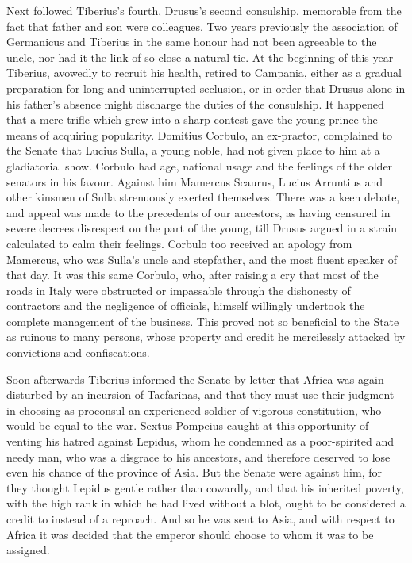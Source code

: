 Next followed Tiberius's fourth, Drusus's second consulship, memorable from the fact that father and son were colleagues. Two years previously the association of Germanicus and Tiberius in the same honour had not been agreeable to the uncle, nor had it the link of so close a natural tie. At the beginning of this year Tiberius, avowedly to recruit his health, retired to Campania, either as a gradual preparation for long and uninterrupted seclusion, or in order that Drusus alone in his father's absence might discharge the duties of the consulship. It happened that a mere trifle which grew into a sharp contest gave the young prince the means of acquiring popularity. Domitius Corbulo, an ex-praetor, complained to the Senate that Lucius Sulla, a young noble, had not given place to him at a gladiatorial show. Corbulo had age, national usage and the feelings of the older senators in his favour. Against him Mamercus Scaurus, Lucius Arruntius and other kinsmen of Sulla strenuously exerted themselves. There was a keen debate, and appeal was made to the precedents of our ancestors, as having censured in severe decrees disrespect on the part of the young, till Drusus argued in a strain calculated to calm their feelings. Corbulo too received an apology from Mamercus, who was Sulla's uncle and stepfather, and the most fluent speaker of that day. It was this same Corbulo, who, after raising a cry that most of the roads in Italy were obstructed or impassable through the dishonesty of contractors and the negligence of officials, himself willingly undertook the complete management of the business. This proved not so beneficial to the State as ruinous to many persons, whose property and credit he mercilessly attacked by convictions and confiscations.


Soon afterwards Tiberius informed the Senate by letter that Africa was again disturbed by an incursion of Tacfarinas, and that they must use their judgment in choosing as proconsul an experienced soldier of vigorous constitution, who would be equal to the war. Sextus Pompeius caught at this opportunity of venting his hatred against Lepidus, whom he condemned as a poor-spirited and needy man, who was a disgrace to his ancestors, and therefore deserved to lose even his chance of the province of Asia. But the Senate were against him, for they thought Lepidus gentle rather than cowardly, and that his inherited poverty, with the high rank in which he had lived without a blot, ought to be considered a credit to instead of a reproach. And so he was sent to Asia, and with respect to Africa it was decided that the emperor should choose to whom it was to be assigned.

